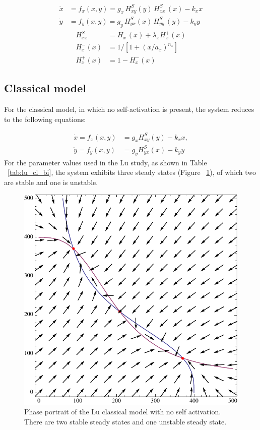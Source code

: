 \begin{align}
\dot{x} &= f_{x}(x,y) =g_{x}\, H^{S}_{xy}(y)\, H^{S}_{xx}\,(x)-k_{x}x \label{eq:lu_both_1} \\
\dot{y} &= f_{y}(x,y) =g_{y}\,H^{S}_{yx}(x)\,H^{S}_{yy}\,(y)-k_{y}y \label{eq:lu_both_2}
\end{align}
\begin{align}
H^{S}_{xx} &= H^{-}_{x}(x)+\lambda_{x}H^{+}_{x}(x)\label{eq:lu_hsxx}\\
H^{-}_{x}(x) &= 1 \big/\left[1+(x/a_{x})^{n_{x}}\right]\label{eq:lu_hpx}\\
H^{+}_{x}(x) &= 1-H^{-}_{x}(x)\label{eq:lu_hmx}
\end{align}
\subsection{Classical model}
For the classical model, in which no self-activation is present, the system reduces to the following equations:

\begin{align}
\dot{x}=f_{x}(x,y) &= g_{x}H^{S}_{xy}(y)-k_{x}x,\label{eq:lu_cl_1}\\
\dot{y}=f_{y}(x,y) &= g_{y}H^{S}_{yx}(x)-k_{y}y\label{eq:lu_cl_2}
\end{align}
For the parameter values used in the Lu study, as shown in Table ~\ref{tab:lu_cl_bi}, the system exhibits three steady states (Figure ~\ref{fig:lu_bis_class}), of which two are stable and one is unstable. 


\begin{figure}[p]
\centering
\includegraphics[scale=0.7]{chapterModelling/images/Lu/mae/classic.pdf}
\caption[Phase portrait of the Lu classical model with no self activation]{Phase portrait of the Lu classical model with no self activation. There are two stable steady states and one unstable steady state.}
\label{fig:lu_bis_class}
\end{figure}

